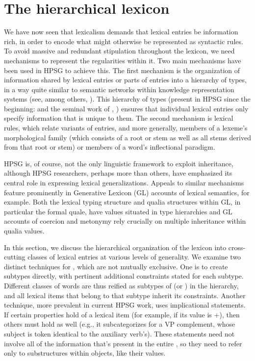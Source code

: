 \documentclass[output=paper
 	        ,biblatex
                ,babelshorthands
                ,newtxmath
                ,draftmode
                ,colorlinks, citecolor=brown
]{langscibook}
\begin{document}
\section{The hierarchical lexicon}
\label{sec:hier-lex}


We have now seen that lexicalism demands that lexical entries be information rich, in order to encode what might otherwise be represented as syntactic rules.
To avoid massive and redundant stipulation throughout the lexicon, we need mechanisms to represent the regularities within it. Two main mechanisms have been used in HPSG to achieve this. The first mechanism is the organization of information shared by lexical entries or parts of entries into a hierarchy of types, in a way quite similar to semantic networks within knowledge representation systems (see, among others, \citealt{BrachmanandSchmolze1985}). This hierarchy of types (present in HPSG since the beginning: \citealt{PollardandSag1987} and the seminal work of  \citealt{Flickingeretal1985}, \citealt{Flickinger1987}) ensures that individual lexical entries only specify information that is unique to them. The second mechanism is lexical rules, which relate variants of entries, and more generally, members of a lexeme's morphological family (which consists of a root or stem as well as all stems derived from that root or stem) or members of a word's inflectional paradigm.     

HPSG is, of course, not the only linguistic framework to exploit inheritance, although HPSG researchers, perhaps more than others, have emphasized its central role in expressing lexical generalizations.
Appeals to similar mechanisms feature prominently in Generative Lexicon (GL) accounts of lexical semantics, for example.
Both the lexical typing structure and qualia structures within GL, in particular the formal quale, have values situated in type hierarchies \citep{PustejovskyandJezek1996} and
GL accounts of coercion and metonymy rely crucially on multiple inheritance within qualia values.

In this section, we discuss the hierarchical organization of the lexicon into cross-cutting classes of lexical entries at various levels of generality.
We examine two distinct techniques for , which are not mutually exclusive.
One is to create subtypes directly, with pertinent additional constraints stated for each subtype.
Different classes of words are thus reified as subtypes of  (or ) in the hierarchy, and all lexical items that belong to that subtype inherit its constraints.
Another technique, more prevalent in current HPSG work, uses implicational statements.
If certain properties hold of a lexical item (for example, if its  value is +), then others must hold as well (e.g., it subcategorizes for a VP complement, whose subject is token identical to the auxiliary verb's).
These statements need not involve all of the information that's present in the entire , so they need to refer only to substructures within  objects, like their  values.
\end{document}
